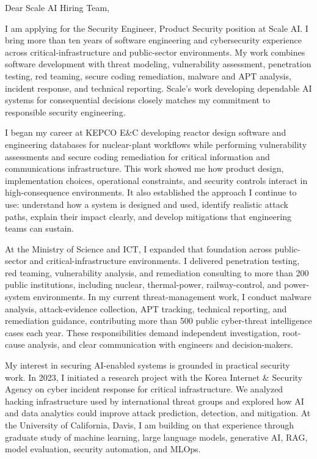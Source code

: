 \documentclass[12pt]{article}
\begin{document}
\onehalfspacing

Dear Scale AI Hiring Team,

I am applying for the Security Engineer, Product Security position at Scale AI. I bring more than ten years of software engineering and cybersecurity experience across critical-infrastructure and public-sector environments. My work combines software development with threat modeling, vulnerability assessment, penetration testing, red teaming, secure coding remediation, malware and APT analysis, incident response, and technical reporting. Scale's work developing dependable AI systems for consequential decisions closely matches my commitment to responsible security engineering.

I began my career at KEPCO E\&C developing reactor design software and engineering databases for nuclear-plant workflows while performing vulnerability assessments and secure coding remediation for critical information and communications infrastructure. This work showed me how product design, implementation choices, operational constraints, and security controls interact in high-consequence environments. It also established the approach I continue to use: understand how a system is designed and used, identify realistic attack paths, explain their impact clearly, and develop mitigations that engineering teams can sustain.

At the Ministry of Science and ICT, I expanded that foundation across public-sector and critical-infrastructure environments. I delivered penetration testing, red teaming, vulnerability analysis, and remediation consulting to more than 200 public institutions, including nuclear, thermal-power, railway-control, and power-system environments. In my current threat-management work, I conduct malware analysis, attack-evidence collection, APT tracking, technical reporting, and remediation guidance, contributing more than 500 public cyber-threat intelligence cases each year. These responsibilities demand independent investigation, root-cause analysis, and clear communication with engineers and decision-makers.

My interest in securing AI-enabled systems is grounded in practical security work. In 2023, I initiated a research project with the Korea Internet \& Security Agency on cyber incident response for critical infrastructure. We analyzed hacking infrastructure used by international threat groups and explored how AI and data analytics could improve attack prediction, detection, and mitigation. At the University of California, Davis, I am building on that experience through graduate study of machine learning, large language models, generative AI, RAG, model evaluation, security automation, and MLOps.
\end{document}

